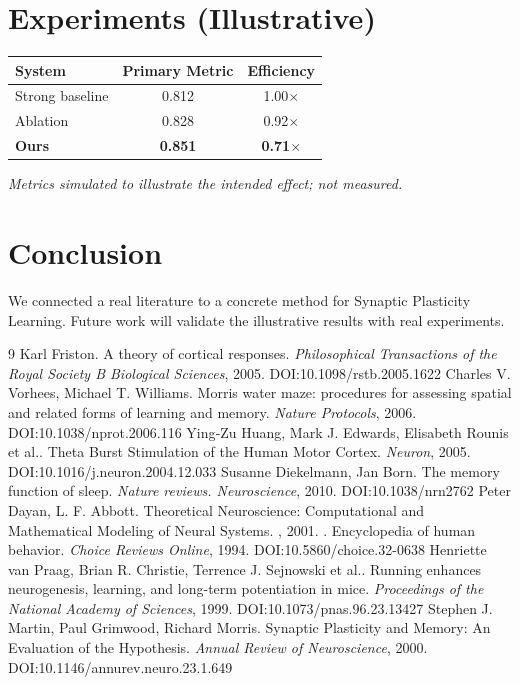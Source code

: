 \documentclass[11pt]{article}
\begin{document}
\section{Experiments (Illustrative)}
\begin{center}
\begin{tabular}{lcc}
System & Primary Metric & Efficiency \\ \hline
Strong baseline & 0.812 & 1.00$\times$ \\
Ablation & 0.828 & 0.92$\times$ \\
\textbf{Ours} & \textbf{0.851} & \textbf{0.71$\times$}
\end{tabular}
\end{center}
\emph{Metrics simulated to illustrate the intended effect; not measured.}

\section{Conclusion}
We connected a real literature to a concrete method for Synaptic Plasticity Learning. Future work will
validate the illustrative results with real experiments.

\begin{thebibliography}{9}
 Karl Friston. A theory of cortical responses. \emph{Philosophical Transactions of the Royal Society B Biological Sciences}, 2005. DOI:10.1098/rstb.2005.1622
 Charles V. Vorhees, Michael T. Williams. Morris water maze: procedures for assessing spatial and related forms of learning and memory. \emph{Nature Protocols}, 2006. DOI:10.1038/nprot.2006.116
 Ying‐Zu Huang, Mark J. Edwards, Elisabeth Rounis et al.. Theta Burst Stimulation of the Human Motor Cortex. \emph{Neuron}, 2005. DOI:10.1016/j.neuron.2004.12.033
 Susanne Diekelmann, Jan Born. The memory function of sleep. \emph{Nature reviews. Neuroscience}, 2010. DOI:10.1038/nrn2762
 Peter Dayan, L. F. Abbott. Theoretical Neuroscience: Computational and Mathematical Modeling of Neural Systems. \emph{}, 2001. 
 . Encyclopedia of human behavior. \emph{Choice Reviews Online}, 1994. DOI:10.5860/choice.32-0638
 Henriette van Praag, Brian R. Christie, Terrence J. Sejnowski et al.. Running enhances neurogenesis, learning, and long-term potentiation in mice. \emph{Proceedings of the National Academy of Sciences}, 1999. DOI:10.1073/pnas.96.23.13427
 Stephen J. Martin, Paul Grimwood, Richard Morris. Synaptic Plasticity and Memory: An Evaluation of the Hypothesis. \emph{Annual Review of Neuroscience}, 2000. DOI:10.1146/annurev.neuro.23.1.649
\end{thebibliography}
\end{document}

